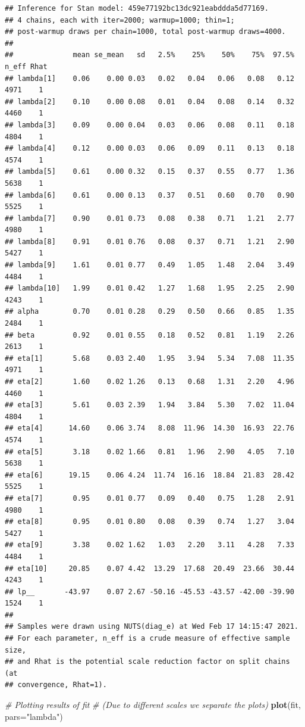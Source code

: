 \documentclass[
]{article}
\newenvironment{Shaded}{\begin{snugshade}}{\end{snugshade}}
\newcommand{\CommentTok}[1]{\textcolor[rgb]{0.56,0.35,0.01}{\textit{#1}}}
\newcommand{\DataTypeTok}[1]{\textcolor[rgb]{0.13,0.29,0.53}{#1}}
\newcommand{\KeywordTok}[1]{\textcolor[rgb]{0.13,0.29,0.53}{\textbf{#1}}}
\newcommand{\NormalTok}[1]{#1}
\newcommand{\StringTok}[1]{\textcolor[rgb]{0.31,0.60,0.02}{#1}}
\begin{document}
\begin{verbatim}
## Inference for Stan model: 459e77192bc13dc921eabddda5d77169.
## 4 chains, each with iter=2000; warmup=1000; thin=1; 
## post-warmup draws per chain=1000, total post-warmup draws=4000.
## 
##              mean se_mean   sd   2.5%    25%    50%    75%  97.5% n_eff Rhat
## lambda[1]    0.06    0.00 0.03   0.02   0.04   0.06   0.08   0.12  4971    1
## lambda[2]    0.10    0.00 0.08   0.01   0.04   0.08   0.14   0.32  4460    1
## lambda[3]    0.09    0.00 0.04   0.03   0.06   0.08   0.11   0.18  4804    1
## lambda[4]    0.12    0.00 0.03   0.06   0.09   0.11   0.13   0.18  4574    1
## lambda[5]    0.61    0.00 0.32   0.15   0.37   0.55   0.77   1.36  5638    1
## lambda[6]    0.61    0.00 0.13   0.37   0.51   0.60   0.70   0.90  5525    1
## lambda[7]    0.90    0.01 0.73   0.08   0.38   0.71   1.21   2.77  4980    1
## lambda[8]    0.91    0.01 0.76   0.08   0.37   0.71   1.21   2.90  5427    1
## lambda[9]    1.61    0.01 0.77   0.49   1.05   1.48   2.04   3.49  4484    1
## lambda[10]   1.99    0.01 0.42   1.27   1.68   1.95   2.25   2.90  4243    1
## alpha        0.70    0.01 0.28   0.29   0.50   0.66   0.85   1.35  2484    1
## beta         0.92    0.01 0.55   0.18   0.52   0.81   1.19   2.26  2613    1
## eta[1]       5.68    0.03 2.40   1.95   3.94   5.34   7.08  11.35  4971    1
## eta[2]       1.60    0.02 1.26   0.13   0.68   1.31   2.20   4.96  4460    1
## eta[3]       5.61    0.03 2.39   1.94   3.84   5.30   7.02  11.04  4804    1
## eta[4]      14.60    0.06 3.74   8.08  11.96  14.30  16.93  22.76  4574    1
## eta[5]       3.18    0.02 1.66   0.81   1.96   2.90   4.05   7.10  5638    1
## eta[6]      19.15    0.06 4.24  11.74  16.16  18.84  21.83  28.42  5525    1
## eta[7]       0.95    0.01 0.77   0.09   0.40   0.75   1.28   2.91  4980    1
## eta[8]       0.95    0.01 0.80   0.08   0.39   0.74   1.27   3.04  5427    1
## eta[9]       3.38    0.02 1.62   1.03   2.20   3.11   4.28   7.33  4484    1
## eta[10]     20.85    0.07 4.42  13.29  17.68  20.49  23.66  30.44  4243    1
## lp__       -43.97    0.07 2.67 -50.16 -45.53 -43.57 -42.00 -39.90  1524    1
## 
## Samples were drawn using NUTS(diag_e) at Wed Feb 17 14:15:47 2021.
## For each parameter, n_eff is a crude measure of effective sample size,
## and Rhat is the potential scale reduction factor on split chains (at 
## convergence, Rhat=1).
\end{verbatim}

\begin{Shaded}
\begin{Highlighting}[]
\CommentTok{# Plotting results of fit}
\CommentTok{# (Due to different scales we separate the plots)}
\KeywordTok{plot}\NormalTok{(fit, }\DataTypeTok{pars=}\StringTok{"lambda"}\NormalTok{)}
\end{Highlighting}
\end{Shaded}
\end{document}
